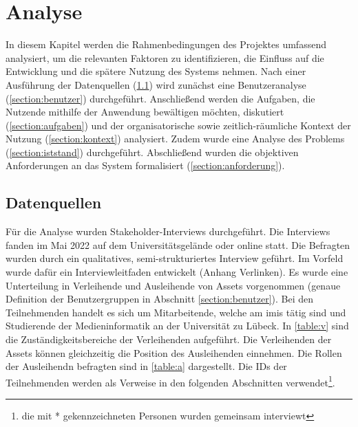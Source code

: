
\chapter{Analyse}
\label{chapter-analyse}

In diesem Kapitel werden die Rahmenbedingungen des Projektes umfassend analysiert, um die relevanten
Faktoren zu identifizieren, die Einfluss auf die Entwicklung und die spätere Nutzung des Systems
nehmen. Nach einer Ausführung der Datenquellen (\ref{section:daten}) wird zunächst eine
Benutzeranalyse (\ref{section:benutzer}) durchgeführt. Anschließend werden die Aufgaben, die
Nutzende mithilfe der Anwendung bewältigen möchten, diskutiert (\ref{section:aufgaben}) und der
organisatorische sowie zeitlich-räumliche Kontext der Nutzung (\ref{section:kontext}) analysiert.
Zudem wurde eine Analyse des Problems (\ref{section:iststand}) durchgeführt. Abschließend
wurden die objektiven Anforderungen an das System formalisiert (\ref{section:anforderung}).

\section{Datenquellen}
\label{section:daten}
Für die Analyse wurden Stakeholder-Interviews durchgeführt. Die Interviews fanden im Mai 2022 auf
dem Universitätsgelände oder online statt. Die Befragten wurden durch ein qualitatives,
semi-strukturiertes Interview geführt. Im Vorfeld wurde dafür ein Interviewleitfaden entwickelt
(Anhang Verlinken). Es wurde eine Unterteilung in Verleihende und Ausleihende von Assets vorgenommen
(genaue Definition der Benutzergruppen in Abschnitt \ref{section:benutzer}). Bei den Teilnehmenden
handelt es sich um Mitarbeitende, welche am \ac{imis} tätig sind und Studierende der
Medieninformatik an der Universität zu Lübeck. In \ref{table:v} sind die Zuständigkeitsbereiche der
Verleihenden aufgeführt. Die Verleihenden der Assets können gleichzeitig die Position des
Ausleihenden einnehmen. Die Rollen der Ausleihendn befragten sind in \ref{table:a} dargestellt. Die
IDs der Teilnehmenden werden als Verweise in den folgenden Abschnitten verwendet\footnote{die mit *
gekennzeichneten Personen wurden gemeinsam interviewt}.

